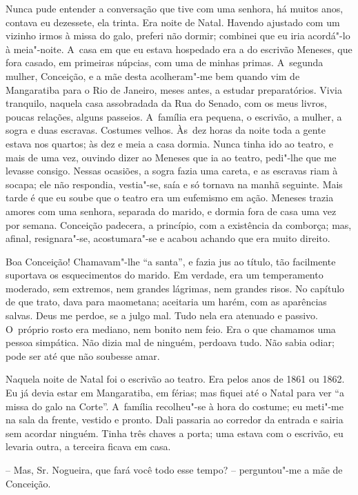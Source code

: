 Nunca pude entender a conversação que tive com uma senhora, há muitos
anos, contava eu dezessete, ela trinta. Era noite de Natal. Havendo
ajustado com um vizinho irmos à missa do galo, preferi não dormir;
combinei que eu iria acordá"-lo à meia"-noite. A~casa em que eu estava
hospedado era a do escrivão Meneses, que fora casado, em primeiras
núpcias, com uma de minhas primas. A~segunda mulher, Conceição, e a mãe
desta acolheram"-me bem quando vim de Mangaratiba para o Rio de Janeiro,
meses antes, a estudar preparatórios. Vivia tranquilo, naquela casa
assobradada da Rua do Senado, com os meus livros, poucas relações,
alguns passeios. A~família era pequena, o escrivão, a mulher, a sogra e
duas escravas. Costumes velhos. Às~dez horas da noite toda a gente
estava nos quartos; às dez e meia a casa dormia. Nunca tinha ido ao
teatro, e mais de uma vez, ouvindo dizer ao Meneses que ia ao teatro,
pedi"-lhe que me levasse consigo. Nessas ocasiões, a sogra fazia uma
careta, e as escravas riam à socapa; ele não respondia, vestia"-se, saía
e só tornava na manhã seguinte. Mais tarde é que eu soube que o teatro
era um eufemismo em ação. Meneses trazia amores com uma senhora,
separada do marido, e dormia fora de casa uma vez por semana. Conceição
padecera, a princípio, com a existência da comborça; mas, afinal,
resignara"-se, acostumara"-se e acabou achando que era muito direito.

Boa Conceição! Chamavam"-lhe ``a santa'', e fazia jus ao título, tão
facilmente suportava os esquecimentos do marido. Em verdade, era um
temperamento moderado, sem extremos, nem grandes lágrimas, nem grandes
risos. No capítulo de que trato, dava para maometana; aceitaria um
harém, com as aparências salvas. Deus me perdoe, se a julgo mal. Tudo
nela era atenuado e passivo. O~próprio rosto era mediano, nem bonito nem
feio. Era o que chamamos uma pessoa simpática. Não dizia mal de ninguém,
perdoava tudo. Não sabia odiar; pode ser até que não soubesse amar.

Naquela noite de Natal foi o escrivão ao teatro. Era pelos anos de 1861
ou 1862. Eu já devia estar em Mangaratiba, em férias; mas fiquei até o
Natal para ver ``a missa do galo na Corte''. A~família recolheu"-se à
hora do costume; eu meti"-me na sala da frente, vestido e pronto. Dali
passaria ao corredor da entrada e sairia sem acordar ninguém. Tinha três
chaves a porta; uma estava com o escrivão, eu levaria outra, a terceira
ficava em casa.

-- Mas, Sr. Nogueira, que fará você todo esse tempo? -- perguntou"-me a
mãe de Conceição.

